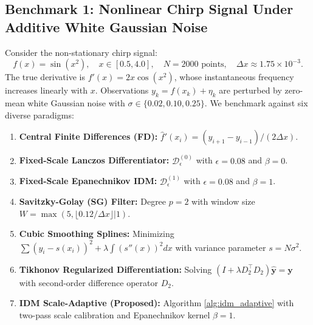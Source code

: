 \documentclass[11pt,a4paper]{article}
\theoremstyle{definition}
\begin{document}
\subsection{Benchmark 1: Nonlinear Chirp Signal Under Additive White Gaussian Noise}
Consider the non-stationary chirp signal:
\begin{equation}
f(x) = \sin(x^2), \quad x \in [0.5, 4.0], \quad N = 2000 \text{ points}, \quad \Delta x \approx 1.75 \times 10^{-3}.
\end{equation}
The true derivative is $f'(x) = 2x \cos(x^2)$, whose instantaneous frequency increases linearly with $x$. Observations $y_k = f(x_k) + \eta_k$ are perturbed by zero-mean white Gaussian noise with $\sigma \in \{0.02, 0.10, 0.25\}$. We benchmark against six diverse paradigms:
\begin{enumerate}
    \item \textbf{Central Finite Differences (FD):} $\hat{f}'(x_i) = (y_{i+1} - y_{i-1}) / (2\Delta x)$.
    \item \textbf{Fixed-Scale Lanczos Differentiator:} $\mathcal{D}_\epsilon^{(0)}$ with $\epsilon = 0.08$ and $\beta = 0$.
    \item \textbf{Fixed-Scale Epanechnikov IDM:} $\mathcal{D}_\epsilon^{(1)}$ with $\epsilon = 0.08$ and $\beta = 1$.
    \item \textbf{Savitzky-Golay (SG) Filter:} Degree $p = 2$ with window size $W = \max(5, \lfloor 0.12 / \Delta x \rfloor | 1)$.
    \item \textbf{Cubic Smoothing Splines:} Minimizing $\sum (y_i - s(x_i))^2 + \lambda \int (s''(x))^2 dx$ with variance parameter $s = N \sigma^2$.
    \item \textbf{Tikhonov Regularized Differentiation:} Solving $(I + \lambda D_2^\top D_2) \hat{\mathbf{y}} = \mathbf{y}$ with second-order difference operator $D_2$.
    \item \textbf{IDM Scale-Adaptive (Proposed):} Algorithm \ref{alg:idm_adaptive} with two-pass scale calibration and Epanechnikov kernel $\beta = 1$.
\end{enumerate}
\end{document}
